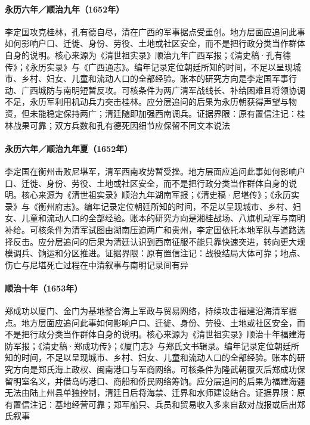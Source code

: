 \hypertarget{social:EQ-1652-DINGGUO-GUILIN}{}\paragraph{永历六年／顺治九年（1652年）}李定国攻克桂林，孔有德自尽，清在广西的军事据点受重创。地方层面应追问此事如何影响户口、迁徙、身份、劳役、土地或社区安全，而不是把行政分类当作群体自身的说明。核心来源为《清世祖实录》顺治九年广西军报；《清史稿·孔有德传》；《永历实录》与《广西通志》。编年记录定位朝廷所知的时间，不足以呈现城市、乡村、妇女、儿童和流动人口的全部经验。账本的研究方向是李定国军事行动、广西城防与南明短暂反攻。可核条件为两广清军战线长、补给困难且将领协调不足，永历军利用机动兵力突击桂林。应分层追问的后果为永历朝获得声望与物资，但未能稳定保持两广；清廷随即加强西南调兵。证据界限：原有置信注记：桂林战果可靠；双方兵数和孔有德死因细节应保留不同文本说法
\hypertarget{social:EQ-1652-DINGGUO-HENGZHOU}{}\paragraph{永历六年／顺治九年夏（1652年）}李定国在衡州击败尼堪军，清军西南攻势暂受挫。地方层面应追问此事如何影响户口、迁徙、身份、劳役、土地或社区安全，而不是把行政分类当作群体自身的说明。核心来源为《清世祖实录》顺治九年湖南军报；《清史稿·尼堪传》；《永历实录》与《衡州府志》。编年记录定位朝廷所知的时间，不足以呈现城市、乡村、妇女、儿童和流动人口的全部经验。账本的研究方向是湘桂战场、八旗机动军与南明补给。可核条件为清军试图由湖南压迫两广和贵州，李定国依托本地军队与道路选择反击。应分层追问的后果为清廷认识到西南征服不能只靠快速突进，转向更大规模调兵、饷运和分区推进。证据界限：原有置信注记：战役结局大体可靠；地点、伤亡与尼堪死亡过程在中清叙事与南明记录间有异
\hypertarget{social:EQ-1653-ZHENG-XIAMEN}{}\paragraph{顺治十年（1653年）}郑成功以厦门、金门为基地整合海上军政与贸易网络，持续攻击福建沿海清军据点。地方层面应追问此事如何影响户口、迁徙、身份、劳役、土地或社区安全，而不是把行政分类当作群体自身的说明。核心来源为《清世祖实录》顺治十年福建海防军报；《清史稿·郑成功传》；《厦门志》与郑氏文书辑录。编年记录定位朝廷所知的时间，不足以呈现城市、乡村、妇女、儿童和流动人口的全部经验。账本的研究方向是郑氏海上政权、闽南港口与军商网络。可核条件为隆武朝覆灭后郑成功保留明室名义，并借岛屿港口、商船和侨民网络筹饷。应分层追问的后果为福建海疆无法由陆上州县单独控制，清廷日后将海禁、迁界和水师建设结合。证据界限：原有置信注记：基地经营可靠；郑军船只、兵员和贸易收入多来自敌对战报或后出郑氏叙事
